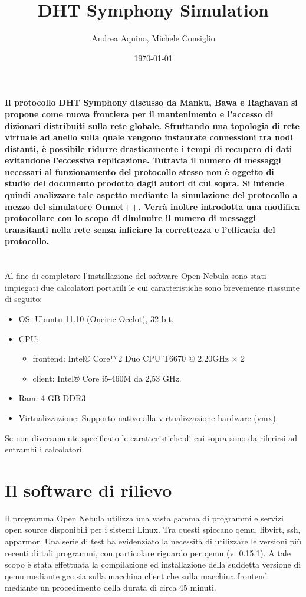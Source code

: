 \documentclass[	
	DIV=calc,
	paper=a4,
	fontsize=11pt,
	onecolumn
]{scrartcl} %
\title{DHT Symphony Simulation}					%
\author{Andrea Aquino, Michele Consiglio}											%
\date{\today}																				%
\begin{document}
	\maketitle
	\thispagestyle{fancy} %
	
	\textbf{Il protocollo DHT Symphony discusso da Manku, Bawa e Raghavan si propone come nuova frontiera per il mantenimento e l'accesso di dizionari distribuiti sulla rete globale. Sfruttando una topologia di rete virtuale ad anello sulla quale vengono instaurate connessioni tra nodi distanti, è possibile ridurre drasticamente i tempi di recupero di dati evitandone l'eccessiva replicazione. Tuttavia il numero di messaggi necessari al funzionamento del protocollo stesso non è oggetto di studio del documento prodotto dagli autori di cui sopra. Si intende quindi analizzare tale aspetto mediante la simulazione del protocollo a mezzo del simulatore Omnet++. Verrà inoltre introdotta una modifica protocollare con lo scopo di diminuire il numero di messaggi transitanti nella rete senza inficiare la correttezza e l'efficacia del protocollo. }

	\section*{}
	Al fine di completare l'installazione del software Open Nebula sono stati impiegati due calcolatori portatili le cui caratteristiche sono brevemente riassunte di seguito:
	
	\begin{itemize}
		\item OS: Ubuntu 11.10 (Oneiric Ocelot), 32 bit.
		\item CPU:
			\begin{itemize}
				\item frontend: Intel® Core™2 Duo CPU T6670 @ 2.20GHz × 2
				\item client: Intel® Core i5-460M da 2,53 GHz. 
			\end{itemize}
		\item Ram: 4 GB DDR3
		\item Virtualizzazione: Supporto nativo alla virtualizzazione hardware (vmx).
	\end{itemize}
	
	Se non diversamente specificato le caratteristiche di cui sopra sono da riferirsi ad entrambi i calcolatori.

\section*{Il software di rilievo}
Il programma Open Nebula utilizza una vasta gamma di programmi e servizi open source disponibili per i sistemi Linux. Tra questi spiccano qemu, libvirt, ssh, apparmor. Una serie di test ha evidenziato la necessità di utilizzare le versioni più recenti di tali programmi, con particolare riguardo per qemu (v. 0.15.1). A tale scopo è stata effettuata la compilazione ed installazione della suddetta versione di qemu mediante gcc sia sulla macchina client che sulla macchina frontend mediante un procedimento della durata di circa 45 minuti.
\end{document}
